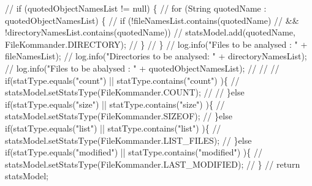 \begin{DoxyCode}
\textcolor{comment}{//        if (quotedObjectNamesList != null) \{}
\textcolor{comment}{//                for (String quotedName : quotedObjectNamesList) \{}
\textcolor{comment}{//                        if (!fileNamesList.contains(quotedName)}
\textcolor{comment}{//                                        &&
       !directoryNamesList.contains(quotedName))}
\textcolor{comment}{//                                statsModel.add(quotedName,
       FileKommander.DIRECTORY);}
\textcolor{comment}{//                \}}
\textcolor{comment}{//        \}}
\textcolor{comment}{//        log.info("Files to be analysed : " + fileNamesList);}
\textcolor{comment}{//        log.info("Directories to be analysed: " + directoryNamesList);}
\textcolor{comment}{//        log.info("Files to be abalysed : " + quotedObjectNamesList);}
\textcolor{comment}{//}
\textcolor{comment}{//}
\textcolor{comment}{//        if(statType.equals("count") || statType.contains("count") )\{}
\textcolor{comment}{//                statsModel.setStatsType(FileKommander.COUNT);}
\textcolor{comment}{//               }
\textcolor{comment}{//        \}else if(statType.equals("size") || statType.contains("size") )\{}
\textcolor{comment}{//                statsModel.setStatsType(FileKommander.SIZEOF);}
\textcolor{comment}{//        \}else if(statType.equals("list") || statType.contains("list") )\{}
\textcolor{comment}{//                statsModel.setStatsType(FileKommander.LIST\_FILES);}
\textcolor{comment}{//        \}else if(statType.equals("modified") || statType.contains("modified")
       )\{}
\textcolor{comment}{//                statsModel.setStatsType(FileKommander.LAST\_MODIFIED);}
\textcolor{comment}{//        \}}
\textcolor{comment}{//        return statsModel;}


\end{DoxyCode}
